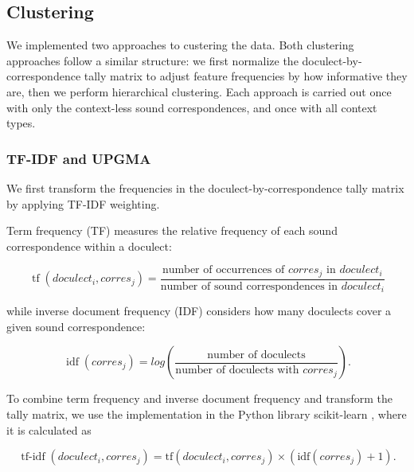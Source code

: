 \documentclass[a4paper]{article}
\begin{document}
\subsection{Clustering}
\label{subsec:clustering}

We implemented two approaches to custering the data.
Both clustering approaches follow a similar structure:
we first normalize the doculect-by-correspondence tally matrix
to adjust feature frequencies by how informative they are,
then we perform hierarchical clustering.
Each approach is carried out once with only
the context-less sound correspondences,
and once with all context types.

\subsubsection{TF-IDF and UPGMA}
\label{subsubsec:tfidf}

We first transform the frequencies
in the doculect-by-correspondence tally matrix
by applying TF-IDF weighting.


Term frequency (TF) measures the relative frequency
of each sound correspondence within a doculect:

\begin{equation*}
\operatorname{tf}(doculect_i, corres_j) =
\frac{\text{number of occurrences of } corres_j \text{ in } doculect_i}
{\text{number of sound correspondences in } doculect_i}
\end{equation*}

while inverse document frequency (IDF)
considers how many doculects cover a given
sound correspondence:

\begin{equation*}
\operatorname{idf}(corres_j) =
log(
\frac{\text{number of doculects}}
{\text{number of doculects with } corres_j}
).
\end{equation*}

To combine term frequency and inverse document frequency
and transform the tally matrix, 
we use the implementation in the Python library scikit-learn
\citep{pedregosa2011scikit-learn},
where it is calculated as

\begin{equation*}
\operatorname{tf-idf}(doculect_i, corres_j) =
\text{tf}(doculect_i, corres_j)
\times
(
\text{idf}(corres_j)
+ 1).
\end{equation*}

\end{document}
